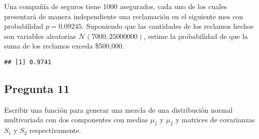 \documentclass[]{article}
\newenvironment{Shaded}{\begin{snugshade}}{\end{snugshade}}
\newcommand{\ControlFlowTok}[1]{\textcolor[rgb]{0.13,0.29,0.53}{\textbf{#1}}}
\newcommand{\DataTypeTok}[1]{\textcolor[rgb]{0.13,0.29,0.53}{#1}}
\newcommand{\DecValTok}[1]{\textcolor[rgb]{0.00,0.00,0.81}{#1}}
\newcommand{\FloatTok}[1]{\textcolor[rgb]{0.00,0.00,0.81}{#1}}
\newcommand{\KeywordTok}[1]{\textcolor[rgb]{0.13,0.29,0.53}{\textbf{#1}}}
\newcommand{\NormalTok}[1]{#1}
\newcommand{\OperatorTok}[1]{\textcolor[rgb]{0.81,0.36,0.00}{\textbf{#1}}}
\newcommand{\StringTok}[1]{\textcolor[rgb]{0.31,0.60,0.02}{#1}}
\begin{document}
Una compañía de seguros tiene 1000 asegurados, cada uno de los cuales
presentará de manera independiente una reclamación en el siguiente mes
con probabilidad \(p=0.09245\). Suponiendo que las cantidades de los
reclamos hechos son variables aleatorias
\(\mathcal{N}(7000, 25000000)\), estime la probabilidad de que la suma
de los reclamos exceda \$500,000.

\begin{Shaded}
\end{Shaded}

\begin{verbatim}
## [1] 0.9741
\end{verbatim}

\hypertarget{pregunta-11}{%
\subsection{Pregunta 11}\label{pregunta-11}}

Escribir una función para generar una mezcla de una distribución normal
multivariada con dos componentes con medias \(\mu_1\) y \(\mu_2\) y
matrices de covarianzas \(S_1\) y \(S_2\) respectivamente.
\end{document}

